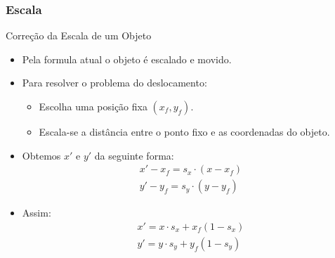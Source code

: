 \documentclass{beamer}
\begin{document}
\begin{frame}
\frametitle{Escala}
	
	\begin{block}{Correção da Escala de um Objeto}
		\begin{itemize}
			\item<1-> Pela formula atual o objeto é escalado e movido.
			\item<2-> Para resolver o problema do deslocamento:
				\begin{itemize}
					\item Escolha uma posição fixa $(x_f,y_f)$.
					\item Escala-se a distância entre o ponto fixo e as coordenadas do objeto.\\
				\end{itemize}
		\end{itemize}
		
		\begin{itemize}
			\item<3-> Obtemos $x'$ e $y'$ da seguinte forma:
				\begin{eqnarray*}
						x'-x_f = s_x \cdot (x - x_f) \\
						y'-y_f = s_y \cdot (y - y_f) 
				\end{eqnarray*}
			\item<4-> Assim:
				 \begin{eqnarray*}
						x'= x \cdot s_x + x_f(1 - s_x) \\
						y'= y \cdot s_y + y_f(1 - s_y)
				\end{eqnarray*}
		\end{itemize}
	\end{block}
\end{frame}
\end{document}
